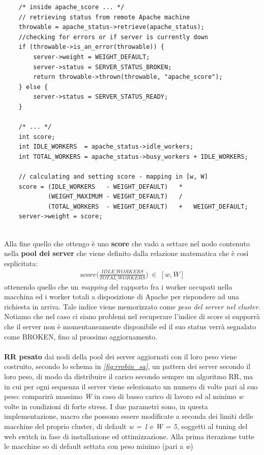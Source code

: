 \documentclass[italian]{tktltiki2}
\begin{document}
\begin{lstlisting}
    /* inside apache_score ... */
    // retrieving status from remote Apache machine
    throwable = apache_status->retrieve(apache_status);   
    //checking for errors or if server is currently down
    if (throwable->is_an_error(throwable)) {
        server->weight = WEIGHT_DEFAULT;
        server->status = SERVER_STATUS_BROKEN;
        return throwable->thrown(throwable, "apache_score");
    } else {
        server->status = SERVER_STATUS_READY;
    }
    
    /* ... */
    int score;
    int IDLE_WORKERS  = apache_status->idle_workers;
    int TOTAL_WORKERS = apache_status->busy_workers + IDLE_WORKERS;

    // calculating and setting score - mapping in [w, W]
    score = (IDLE_WORKERS   - WEIGHT_DEFAULT)   *
            (WEIGHT_MAXIMUM - WEIGHT_DEFAULT)   /
            (TOTAL_WORKERS  - WEIGHT_DEFAULT)   +   WEIGHT_DEFAULT;
    server->weight = score;
       
\end{lstlisting}
Alla fine quello che ottengo è uno \textbf{score} che vado a settare nel nodo contenuto nella \textbf{pool dei server} che viene definito dalla relazione matematica che è così esplicitata:
\begin{align*}
	score\Big(\frac{IDLE\_WORKERS}{TOTAL\_WORKERS}\Big) ~ \in ~ [w, W]
\end{align*}
ottenendo quello che un \emph{mapping} del rapporto fra i worker occupati nella macchina ed i worker totali a disposizione di Apache per rispondere ad una richiesta in arriva. Tale indice viene memorizzato come \emph{peso del server nel cluster}.\\
Notiamo che nel caso ci siano problemi nel recuperare l'indice di score si supporrà che il server non è momentaneamente disponibile ed il suo status verrà segnalato come BROKEN, fino al prossimo aggiornamento.\\\\
\textbf{RR pesato} dai nodi della pool dei server aggiornati con il loro peso viene costruito, secondo lo schema in \emph{\ref{fig:rrobin_sa}}, un pattern dei server secondo il loro peso, di modo da distribuire il carico secondo sempre un algoritmo RR, ma in cui per ogni sequenza il server viene selezionato un numero di volte pari al suo peso: comparirà massimo \emph{W} in caso di basso carico di lavoro ed al minimo \emph{w} volte in condizioni di forte stress. I due parametri sono, in questa implementazione, macro che possono essere modificate a seconda dei limiti delle macchine del proprio cluster, di default \emph{w = 1} e \emph{W = 5}, soggetti al tuning del web switch in fase di installazione ed ottimizzazione. Alla prima iterazione tutte le macchine so di default settata con peso minimo (pari a \emph{w})\\\\
\end{document}
